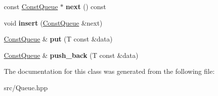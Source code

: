 \begin{DoxyCompactItemize}
\mbox{\label{classathome_1_1utility_1_1_const_queue_af0f8bd9bc50efe7c8b850581f79ae5f0}} 
const \mbox{\hyperlink{classathome_1_1utility_1_1_const_queue}{Const\+Queue}} $\ast$ {\bfseries next} () const
\item 
\mbox{\label{classathome_1_1utility_1_1_const_queue_a949326554bf8cda510ec9f059564fa70}} 
void {\bfseries insert} (\mbox{\hyperlink{classathome_1_1utility_1_1_const_queue}{Const\+Queue}} \&next)
\item 
\mbox{\label{classathome_1_1utility_1_1_const_queue_a0adbbc75ebe07ecf458ee6d32b78a905}} 
\mbox{\hyperlink{classathome_1_1utility_1_1_const_queue}{Const\+Queue}} \& {\bfseries put} (T const \&data)
\item 
\mbox{\label{classathome_1_1utility_1_1_const_queue_a4d87938885acb32dfdbc0e281c05fff5}} 
\mbox{\hyperlink{classathome_1_1utility_1_1_const_queue}{Const\+Queue}} \& {\bfseries push\+\_\+back} (T const \&data)
\end{DoxyCompactItemize}


The documentation for this class was generated from the following file\+:\begin{DoxyCompactItemize}
\item 
src/Queue.\+hpp\end{DoxyCompactItemize}
